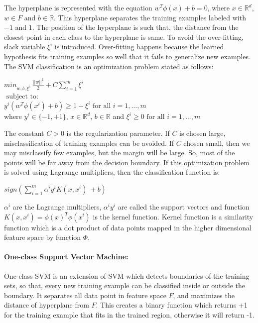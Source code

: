 \documentclass[12pt,oneside,a4paper]{article}
\begin{document}
The hyperplane is represented with the equation $w^{T} \phi(x) + b = 0$, where $x \in \mathbb{R}^d$, $w \in F$ and $b \in \mathbb{R}$. This hyperplane separates the training examples labeled with $-1$ and $1$. The position of the hyperplane is such that, the distance from the closest point in each class to the hyperplane is same. To avoid the over-fitting, slack variable $\xi^{i}$ is introduced. Over-fitting happens because the learned hypothesis fits training examples so well that it fails to generalize new examples. The SVM classification is an optimization problem stated as follows:\cite{svm} \cite{svm-ml}

\begin{center}
  ${min}_{w,b,\xi^i} \ \frac{||w||^2}{2} + C \sum_{i=1}^m \xi^i$ \\
  $\mbox{ subject to: }$ \\
  $y^i( w^T \phi(x^i) + b) \geq 1 - \xi^i \mbox{ for all } i = 1, \dots, m$ \\
  where $y^{i} \in \{-1, +1\}$, $x \in \mathbb{R}^d$, $b \in \mathbb{R}$ and $\xi^i \geq 0 \mbox{ for all } i = 1, \dots, m$ \\
\end{center}

 The constant $C > 0$ is the regularization parameter. If $C$ is chosen large, misclassification of training examples can be avoided. If $C$ chosen small, then we may misclassify few examples, but the margin will be large. So, most of the points will be far away from the decision boundary. If this optimization problem is solved using Lagrange multipliers, then the classification function is:

\begin{center}
$sign(\sum_{i=1}^m \alpha^i y^i K(x,x^i) \ + b)$
\end{center}

$\alpha^i$ are the Lagrange multipliers, $\alpha^i y^i$ are called the support vectors and function $K(x,x^i) = \phi(x)^T \phi(x^i)$ is the kernel function. Kernel function is a similarity function which is a dot product of data points mapped in the higher dimensional feature space by function $\Phi$.

\paragraph{One-class Support Vector Machine:}

One-class SVM is an extension of SVM which detects boundaries of the training sets, so that, every new training example can be classified inside or outside the boundary. It separates all data point in feature space $F$, and maximizes the distance of hyperplane from $F$. This creates a binary function which returns +1 for the training example that fits in the trained region, otherwise it will return -1.
\end{document}
